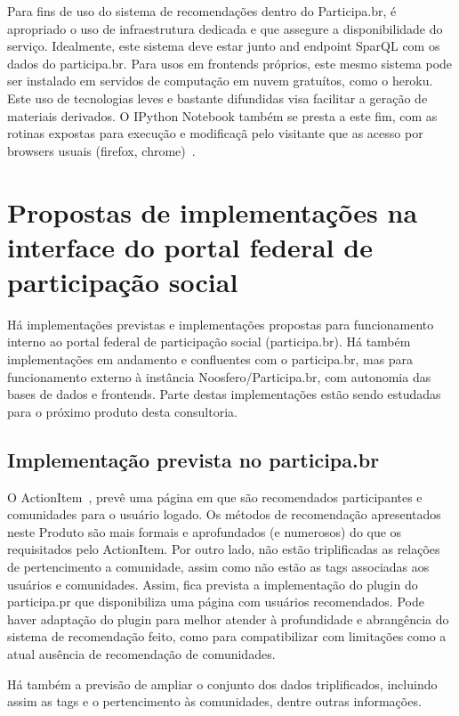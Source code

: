 \documentclass[12pt]{article}
\begin{document}
Para fins de uso do sistema de recomendações dentro do Participa.br, é apropriado o uso de infraestrutura dedicada e que assegure a disponibilidade do serviço. Idealmente, este sistema deve estar junto and endpoint SparQL com os dados do participa.br. Para usos em frontends próprios, este mesmo sistema pode ser instalado em servidos de computação em nuvem gratuítos, como o heroku. Este uso de tecnologias leves e bastante difundidas visa facilitar a geração de materiais derivados. O IPython Notebook também se presta a este fim, com as rotinas expostas para execução e modificaçã pelo visitante que as acesso por browsers usuais (firefox, chrome)~\cite{iNotebook}.

\section{Propostas de implementações na interface do portal federal de participação social}\label{sec:acr}
Há implementações previstas e implementações propostas para funcionamento interno ao portal federal de participação social (participa.br). Há também implementações em andamento e confluentes com o participa.br, mas para funcionamento externo à instância Noosfero/Participa.br, com autonomia das bases de dados e frontends. Parte destas implementações estão sendo estudadas para o próximo produto desta consultoria.

\subsection{Implementação prevista no participa.br}
O ActionItem~\cite{actionItem}, prevê uma página em que são recomendados
participantes e comunidades para o usuário logado. Os métodos de recomendação apresentados neste Produto são mais formais e aprofundados (e numerosos) do que os requisitados pelo ActionItem. Por outro lado, não estão triplificadas as relações de pertencimento a comunidade, assim como não estão as tags associadas aos usuários e comunidades. Assim, fica prevista a implementação do plugin do participa.pr que disponibiliza uma página com usuários recomendados. Pode haver adaptação do plugin para melhor atender à profundidade e abrangência do sistema de recomendação feito, como para compatibilizar com limitações como a atual ausência de recomendação de comunidades.

Há também a previsão de ampliar o conjunto dos dados triplificados, incluindo assim as tags e o pertencimento às comunidades, dentre outras informações.
\end{document}
